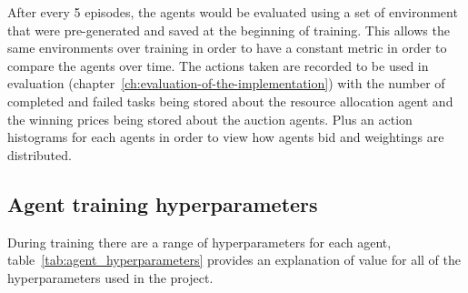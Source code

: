 After every 5 episodes, the agents would be evaluated using a set of environment that were pre-generated and
saved at the beginning of training. This allows the same environments over training in order to have a constant metric
in order to compare the agents over time. The actions taken are recorded to be used in evaluation
(chapter~\ref{ch:evaluation-of-the-implementation}) with the number of completed and failed tasks being stored about
the resource allocation agent and the winning prices being stored about the auction agents. Plus an action histograms
for each agents in order to view how agents bid and weightings are distributed.

\subsection{Agent training hyperparameters}\label{subsec:agent-training-hyperparameters}
During training there are a range of hyperparameters for each agent, table~\ref{tab:agent_hyperparameters} provides
an explanation of value for all of the hyperparameters used in the project.
